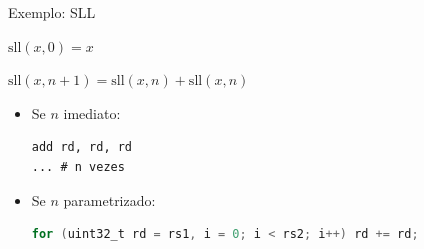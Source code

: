 \documentclass[aspectratio=169]{beamer} %
\begin{document}
\begin{frame}[fragile]{Exemplo: SLL}
    \vspace{0.5em}
    {\centering\large\color{PoliBlue}
     $\mathrm{sll}(x,0) = x$

     \vspace{0.4em}
     $\mathrm{sll}(x,n{+}1) = \mathrm{sll}(x,n) + \mathrm{sll}(x,n)$\par}
    \vspace{1.2em}

    \lstset{basicstyle=\ttfamily\normalsize}
    \large
    \begin{itemize}
        \item Se $n$ imediato:
\begin{lstlisting}
add rd, rd, rd
... # n vezes
\end{lstlisting}
        \item Se $n$ parametrizado:
\begin{lstlisting}[language=C]
for (uint32_t rd = rs1, i = 0; i < rs2; i++) rd += rd;
\end{lstlisting}
    \end{itemize}
\end{frame}
\end{document}
